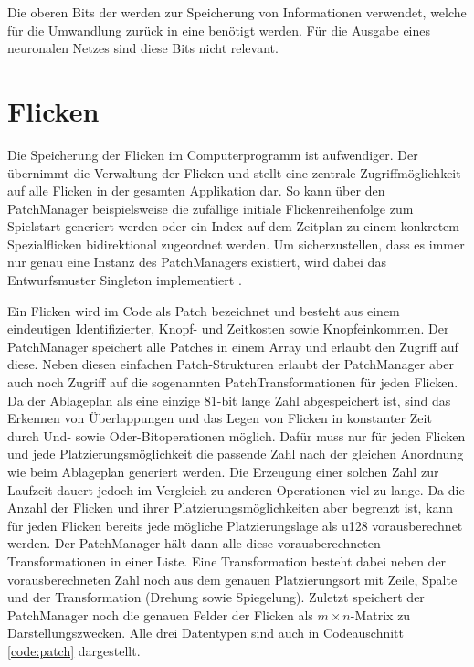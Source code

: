 Die oberen Bits der \hyperref[text:natural-action-id]{} werden zur Speicherung von Informationen verwendet, welche für die Umwandlung zurück in eine \hyperref[text:action-id]{} benötigt werden. Für die Ausgabe eines neuronalen Netzes sind diese Bits nicht relevant.

\section{Flicken}

Die Speicherung der Flicken im Computerprogramm ist aufwendiger. Der  übernimmt die Verwaltung der Flicken und stellt eine zentrale Zugriffmöglichkeit auf alle Flicken in der gesamten Applikation dar. So kann über den PatchManager beispielsweise die zufällige initiale Flickenreihenfolge zum Spielstart generiert werden oder ein Index auf dem Zeitplan zu einem konkretem Spezialflicken bidirektional zugeordnet werden. Um sicherzustellen, dass es immer nur genau eine Instanz des PatchManagers existiert, wird dabei das Entwurfsmuster Singleton implementiert \cite[S. 127]{2000.Gamma}.


\vspace*{-1cm}

Ein Flicken wird im Code als Patch bezeichnet und besteht aus einem eindeutigen Identifizierter, Knopf- und Zeitkosten sowie Knopfeinkommen. Der PatchManager speichert alle Patches in einem Array und erlaubt den Zugriff auf diese. Neben diesen einfachen Patch-Strukturen erlaubt der PatchManager aber auch noch Zugriff auf die sogenannten PatchTransformationen für jeden Flicken. Da der Ablageplan als eine einzige 81-bit lange Zahl abgespeichert ist, sind das Erkennen von Überlappungen und das Legen von Flicken in konstanter Zeit durch Und- sowie Oder-Bitoperationen möglich. Dafür muss nur für jeden Flicken und jede Platzierungsmöglichkeit die passende Zahl nach der gleichen Anordnung wie beim Ablageplan generiert werden. Die Erzeugung einer solchen Zahl zur Laufzeit dauert jedoch im Vergleich zu anderen Operationen viel zu lange. Da die Anzahl der Flicken und ihrer Platzierungsmöglichkeiten aber begrenzt ist, kann für jeden Flicken bereits jede mögliche Platzierungslage als \ac{u128} vorausberechnet werden. Der PatchManager hält dann alle diese vorausberechneten Transformationen in einer Liste. Eine Transformation besteht dabei neben der vorausberechneten Zahl noch aus dem genauen Platzierungsort mit Zeile, Spalte und der Transformation (Drehung sowie Spiegelung). Zuletzt speichert der PatchManager noch die genauen Felder der Flicken als $m\times n$-Matrix zu Darstellungszwecken. Alle drei Datentypen sind auch in Codeauschnitt \ref{code:patch} dargestellt.

